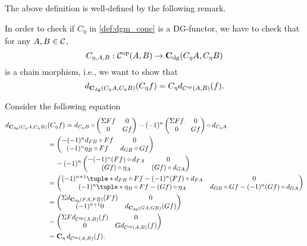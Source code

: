 The above definition is well-defined by the following remark.
\begin{remark}
    In order to check if \( C_{\eta} \) in \autoref{def:dgm_cone} is a DG-functor, we have to check that for any \( A, B \in {\mathcal{C}} \),
    \[
        C_{\eta, A, B}: {\mathcal{C}}^{\operatorname{op}}(A, B) \to \operatorname{\mathbf{C}}_{\operatorname{dg}}(C_{\eta} A, C_{\eta} B)
    \]
    is a chain morphism, i.e., we want to show that
    \[
        d_{\operatorname{\mathbf{C}}_{\operatorname{dg}}(C_{\eta} A, C_{\eta} B)}(C_{\eta} f) = C_{\eta} d_{{\mathcal{C}}^{\operatorname{op}}(A, B)}(f).
    \]

    Consider the following equation
    \begin{align*}
        d_{\C_{\dg}(C_{\eta} A, C_{\eta} B)}&(C_{\eta} f) = d_{C_{\eta} B} \circ
        \begin{pmatrix}
            \Sigma F f & 0 \\
            0 & G f
        \end{pmatrix}
        - (-1)^n
        \begin{pmatrix}
            \Sigma F f & 0 \\
            0 & G f
        \end{pmatrix}
        \circ d_{C_{\eta} A} \\
        &=
        \begin{pmatrix}
            -(-1)^n d_{F B} \circ F f & 0 \\
            (-1)^n \eta_B \circ F f & d_{G B} \circ G f
        \end{pmatrix} \\
        &\hspace{0.4cm} - (-1)^n
        \begin{pmatrix}
            -(-1)^n (F f) \circ d_{F A} & 0 \\
            (G f) \circ \eta_A & (G f) \circ d_{G A}
        \end{pmatrix} \\
        &=
        \begin{pmatrix}
            (-1)^{n + 1}\tuple*{d_{F B} \circ F f - (-1)^n (F f) \circ d_{F A}} & 0 \\
            (-1)^n\tuple*{\eta_B \circ F f - (G f) \circ \eta_A} & d_{G B} \circ G f - (-1)^n (G f) \circ d_{G A}
        \end{pmatrix} \\
        &=
        \begin{pmatrix}
            \Sigma d_{\C_{\dg}(F A, F B)}(F f) & 0 \\
            (-1)^{n + 1} 0 & d_{\C_{\dg}(G A, G B)}(G f)
        \end{pmatrix} \\
        &=
        \begin{pmatrix}
            \Sigma F d_{\Cc^{\op}(A, B)}(f) & 0 \\
            0 & G d_{\Cc^{\op}(A, B)}(f)
        \end{pmatrix} \\
        &= \C_{\eta} d_{\Cc^{\op}(A, B)}(f).
    \end{align*}
\end{remark}

